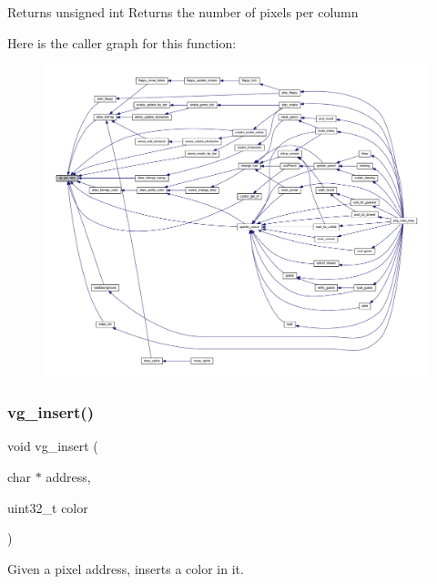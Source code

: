 \begin{DoxyReturn}{Returns}
unsigned int Returns the number of pixels per column 
\end{DoxyReturn}
Here is the caller graph for this function\+:\nopagebreak
\begin{figure}[H]
\begin{center}
\leavevmode
\includegraphics[width=350pt]{group__video_ga4633499e0f197ac855f56473fc9fb291_icgraph}
\end{center}
\end{figure}
\mbox{\label{group__video_ga9ce8b7520a298fda9e59cdeffbbd8670}} 
\subsubsection{\texorpdfstring{vg\+\_\+insert()}{vg\_insert()}}
{\footnotesize\ttfamily void vg\+\_\+insert (\begin{DoxyParamCaption}\item[{char $\ast$}]{address,  }\item[{uint32\+\_\+t}]{color }\end{DoxyParamCaption})}



Given a pixel address, inserts a color in it. 


